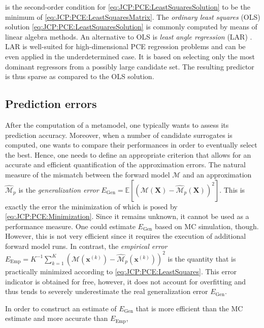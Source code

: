 is the second-order condition for \cref{eq:JCP:PCE:LeastSquaresSolution} to be the minimum of \cref{eq:JCP:PCE:LeastSquaresMatrix}.
The \emph{ordinary least squares} (OLS) solution \cref{eq:JCP:PCE:LeastSquaresSolution} is commonly computed by means of linear algebra methods.
An alternative to OLS is \emph{least angle regression} (LAR) \cite{Statistics:Efron2004:a,Statistics:Hesterberg2008}.
LAR is well-suited for high-dimensional PCE regression problems \cite{PCE:Blatman2011} and can be even applied in the underdetermined case.
It is based on selecting only the most dominant regressors from a possibly large candidate set.
The resulting predictor is thus sparse as compared to the OLS solution.

\subsection{Prediction errors}
After the computation of a metamodel, one typically wants to assess its prediction accuracy.
Moreover, when a number of candidate surrogates is computed, one wants to compare their performances in order to eventually select the best.
Hence, one needs to define an appropriate criterion that allows for an accurate and efficient quantification of the approximation errors.
The natural measure of the mismatch between the forward model \(\mathcal{M}\) and an approximation \(\hat{\mathcal{M}}_p\)
is the \emph{generalization error} \(E_{\mathrm{Gen}} = \mathds{E}[(\mathcal{M}(\bm{X})-\hat{\mathcal{M}}_p(\bm{X}))^2]\).
This is exactly the error the minimization of which is posed by \cref{eq:JCP:PCE:Minimization}.
Since it remains unknown, it cannot be used as a performance measure.
One could estimate \(E_{\mathrm{Gen}}\) based on MC simulation, though.
However, this is not very efficient since it requires the execution of additional forward model runs.
In contrast, the \emph{empirical error} \(E_{\mathrm{Emp}} = K^{-1} \sum_{k=1}^K (\mathcal{M}(\bm{x}^{(k)})-\hat{\mathcal{M}}_p(\bm{x}^{(k)}))^2\)
is the quantity that is practically minimized according to \cref{eq:JCP:PCE:LeastSquares}.
This error indicator is obtained for free, however, it does not account for overfitting and thus tends to severely underestimate the real generalization error \(E_{\mathrm{Gen}}\).
\par %
In order to construct an estimate of \(E_{\mathrm{Gen}}\) that is more efficient than the MC estimate and more accurate than \(E_{\mathrm{Emp}}\),
